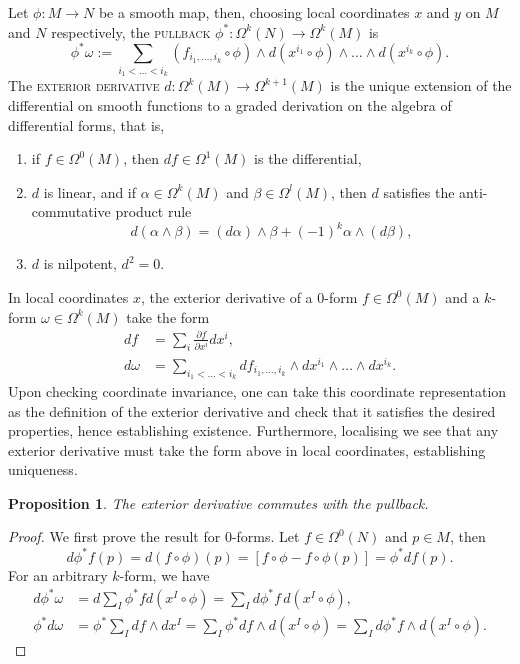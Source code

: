 \documentclass[reqno]{amsart}
\newtheorem{proposition}[theorem]{Proposition}
\theoremstyle{definition}
\theoremstyle{remark}
\renewcommand{\emph}{\textsc}
\begin{document}
Let $\phi : M \to N$ be a smooth map, then, choosing local coordinates $x$ and $y$ on $M$ and $N$ respectively, the \emph{pullback} $\phi^* : \Omega^k (N) \to \Omega^k (M)$ is
		\[ \phi^* \omega := \sum_{i_1 < \dots < i_k} (f_{i_1, \dots, i_k} \circ \phi) \wedge d(x^{i_1} \circ \phi) \wedge \dots \wedge d(x^{i_k} \circ \phi).\]
The \emph{exterior derivative} $d : \Omega^{k} (M) \to \Omega^{k + 1} (M)$ is the unique extension of the differential on smooth functions to a graded derivation on the algebra of differential forms, that is, 
\begin{enumerate}
	\item if $f \in \Omega^0 (M)$, then $df \in \Omega^1 (M)$ is the differential, 
	
	\item $d$ is linear, and if $\alpha \in \Omega^k (M)$ and $\beta \in \Omega^l (M)$, then $d$ satisfies the anti-commutative product rule
		\[ d(\alpha \wedge \beta) = (d \alpha) \wedge \beta + (-1)^k \alpha \wedge (d \beta), \]
	
	\item $d$ is nilpotent, $d^2 = 0$. 
\end{enumerate}
In local coordinates $x$, the exterior derivative of a $0$-form $f \in \Omega^0 (M)$ and a $k$-form $\omega \in \Omega^k (M)$ take the form
	\begin{align*}
		df
			&= \sum_{i} \frac{\partial f}{\partial x^i} dx^i, \\
		d \omega
			&= \sum_{i_1 < \dots < i_k} df_{i_1, \dots, i_k} \wedge dx^{i_1} \wedge \dots \wedge dx^{i_k}.
	\end{align*}
Upon checking coordinate invariance, one can take this coordinate representation as the definition of the exterior derivative and check that it satisfies the desired properties, hence establishing existence. Furthermore, localising we see that any exterior derivative must take the form above in local coordinates, establishing uniqueness. 

\begin{proposition}
	The exterior derivative commutes with the pullback. 
\end{proposition}

\begin{proof}
	We first prove the result for $0$-forms. Let $f \in \Omega^0 (N)$ and $p \in M$, then 
		\[ d  \phi^*f(p) = d(f \circ \phi) (p) = [f \circ \phi - f \circ \phi(p)] = \phi^* df (p). \]
	For an arbitrary $k$-form, we have
	\begin{align*}
		d \phi^* \omega
			&= d \sum_I \phi^* f d(x^I \circ \phi) = \sum_I d\phi^* f \, d(x^I \circ \phi), \\
		\phi^* d \omega
			&= \phi^* \sum_I df \wedge d x^I = \sum_I \phi^* d f \wedge d (x^I \circ \phi) = \sum_I d\phi^* f \wedge d(x^I \circ \phi).	
	\end{align*}
\end{proof}
\end{document}
